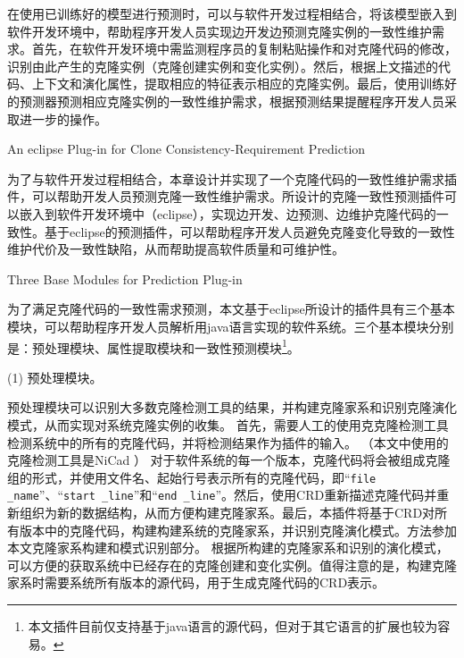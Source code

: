 {在使用已训练好的模型进行预测时，可以与软件开发过程相结合，将该模型嵌入到软件开发环境中，帮助程序开发人员实现边开发边预测克隆实例的一致性维护需求。首先，在软件开发环境中需监测程序员的复制粘贴操作和对克隆代码的修改，识别由此产生的克隆实例（克隆创建实例和变化实例）。然后，根据上文描述的代码、上下文和演化属性，提取相应的特征表示相应的克隆实例。最后，使用训练好的预测器预测相应克隆实例的一致性维护需求，根据预测结果提醒程序开发人员采取进一步的操作。






{An eclipse Plug-in for Clone Consistency-Requirement Prediction}

为了与软件开发过程相结合，本章设计并实现了一个克隆代码的一致性维护需求插件，可以帮助开发人员预测克隆一致性维护需求。所设计的克隆一致性预测插件可以嵌入到软件开发环境中（eclipse），实现边开发、边预测、边维护克隆代码的一致性。基于eclipse的预测插件，可以帮助程序开发人员避免克隆变化导致的一致性维护代价及一致性缺陷，从而帮助提高软件质量和可维护性。


{Three Base Modules for Prediction Plug-in }

为了满足克隆代码的一致性需求预测，本文基于eclipse所设计的插件具有三个基本模块，可以帮助程序开发人员解析用java语言实现的软件系统。三个基本模块分别是：预处理模块、属性提取模块和一致性预测模块\footnote{本文插件目前仅支持基于java语言的源代码，但对于其它语言的扩展也较为容易。}。%

(1) 预处理模块。

预处理模块可以识别大多数克隆检测工具的结果，并构建克隆家系和识别克隆演化模式，从而实现对系统克隆实例的收集。
首先，需要人工的使用克克隆检测工具检测系统中的所有的克隆代码，并将检测结果作为插件的输入。 （本文中使用的克隆检测工具是NiCad \cite {roy2008clone}）
对于软件系统的每一个版本，克隆代码将会被组成克隆组的形式，并使用文件名、起始行号表示所有的克隆代码，即“{\tt file \_name}”、“{\tt start \_line}”和“{\tt end \_line}”。然后，使用CRD重新描述克隆代码并重新组织为新的数据结构，从而方便构建克隆家系。最后，本插件将基于CRD对所有版本中的克隆代码，构建构建系统的克隆家系，并识别克隆演化模式。方法参加本文克隆家系构建和模式识别部分。
根据所构建的克隆家系和识别的演化模式，可以方便的获取系统中已经存在的克隆创建和变化实例。值得注意的是，构建克隆家系时需要系统所有版本的源代码，用于生成克隆代码的CRD表示。

}
